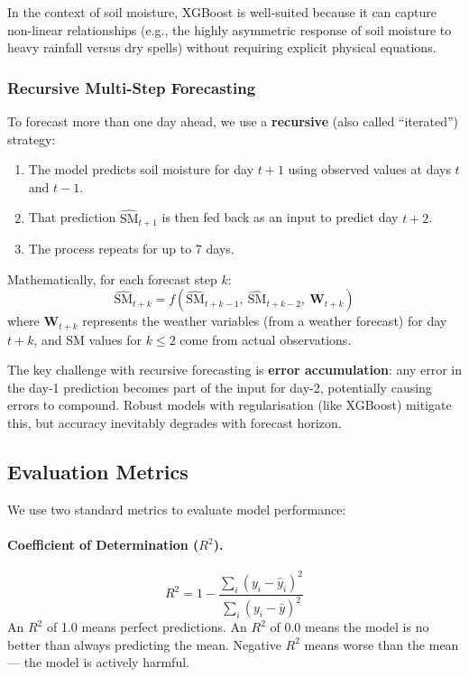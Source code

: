 \documentclass[12pt, a4paper]{article}
\begin{document}
In the context of soil moisture, XGBoost is well-suited because it can capture non-linear relationships (e.g., the highly asymmetric response of soil moisture to heavy rainfall versus dry spells) without requiring explicit physical equations.

\subsubsection{Recursive Multi-Step Forecasting}

To forecast more than one day ahead, we use a \textbf{recursive} (also called ``iterated'') strategy:

\begin{enumerate}
    \item The model predicts soil moisture for day $t+1$ using observed values at days $t$ and $t-1$.
    \item That prediction $\widehat{\text{SM}}_{t+1}$ is then fed back as an input to predict day $t+2$.
    \item The process repeats for up to 7 days.
\end{enumerate}

Mathematically, for each forecast step $k$:
\[
\widehat{\text{SM}}_{t+k} = f\!\left(\widehat{\text{SM}}_{t+k-1},\ \widehat{\text{SM}}_{t+k-2},\ \mathbf{W}_{t+k}\right)
\]
where $\mathbf{W}_{t+k}$ represents the weather variables (from a weather forecast) for day $t+k$, and SM values for $k \leq 2$ come from actual observations.

The key challenge with recursive forecasting is \textbf{error accumulation}: any error in the day-1 prediction becomes part of the input for day-2, potentially causing errors to compound. Robust models with regularisation (like XGBoost) mitigate this, but accuracy inevitably degrades with forecast horizon.

\subsection{Evaluation Metrics}

We use two standard metrics to evaluate model performance:

\paragraph{Coefficient of Determination ($R^2$).}
\[
R^2 = 1 - \frac{\sum_i (y_i - \hat{y}_i)^2}{\sum_i (y_i - \bar{y})^2}
\]
An $R^2$ of 1.0 means perfect predictions. An $R^2$ of 0.0 means the model is no better than always predicting the mean. Negative $R^2$ means worse than the mean --- the model is actively harmful.
\end{document}
